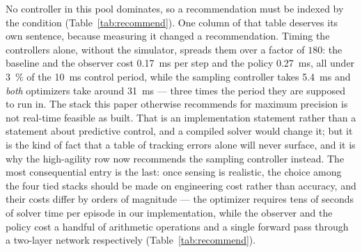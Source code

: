 No controller in this pool dominates, so a recommendation must be indexed by the
condition (Table~\ref{tab:recommend}). One column of that table deserves its own
sentence, because measuring it changed a recommendation. Timing the controllers alone,
without the simulator, spreads them over a factor of $180$: the baseline and the
observer cost \SI{0.17}{\milli\second} per step and the policy \SI{0.27}{\milli\second},
all under \SI{3}{\percent} of the \SI{10}{\milli\second} control period, while the
sampling controller takes \SI{5.4}{\milli\second} and \emph{both} optimizers take around
\SI{31}{\milli\second} --- three times the period they are supposed to run in. The stack
this paper otherwise recommends for maximum precision is not real-time feasible as
built. That is an implementation statement rather than a statement about predictive
control, and a compiled solver would change it; but it is the kind of fact that a table
of tracking errors alone will never surface, and it is why the high-agility row now
recommends the sampling controller instead. The most consequential entry is the last: once
sensing is realistic, the choice among the four tied stacks should be made on
engineering cost rather than accuracy, and their costs differ by orders of magnitude ---
the optimizer requires tens of seconds of solver time per episode in our implementation,
while the observer and the policy cost a handful of arithmetic operations and a single
forward pass through a two-layer network respectively (Table~\ref{tab:recommend}).

